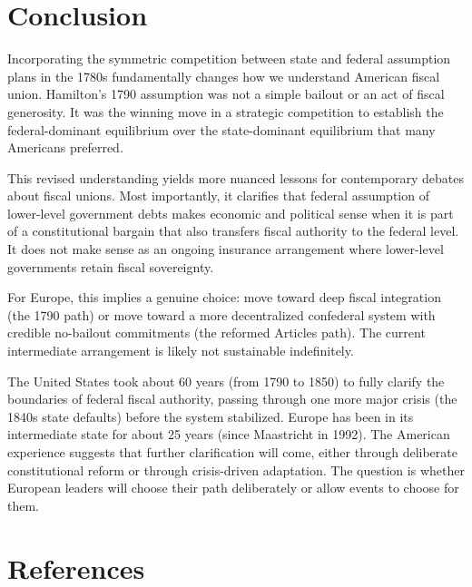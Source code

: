 \documentclass[12pt]{article}
\begin{document}
\section{Conclusion}

Incorporating the symmetric competition between state and federal assumption plans in the 1780s fundamentally changes how we understand American fiscal union. Hamilton's 1790 assumption was not a simple bailout or an act of fiscal generosity. It was the winning move in a strategic competition to establish the federal-dominant equilibrium over the state-dominant equilibrium that many Americans preferred.

This revised understanding yields more nuanced lessons for contemporary debates about fiscal unions. Most importantly, it clarifies that federal assumption of lower-level government debts makes economic and political sense when it is part of a constitutional bargain that also transfers fiscal authority to the federal level. It does not make sense as an ongoing insurance arrangement where lower-level governments retain fiscal sovereignty.

For Europe, this implies a genuine choice: move toward deep fiscal integration (the 1790 path) or move toward a more decentralized confederal system with credible no-bailout commitments (the reformed Articles path). The current intermediate arrangement is likely not sustainable indefinitely.

The United States took about 60 years (from 1790 to 1850) to fully clarify the boundaries of federal fiscal authority, passing through one more major crisis (the 1840s state defaults) before the system stabilized. Europe has been in its intermediate state for about 25 years (since Maastricht in 1992). The American experience suggests that further clarification will come, either through deliberate constitutional reform or through crisis-driven adaptation. The question is whether European leaders will choose their path deliberately or allow events to choose for them.

\section*{References}
\end{document}
